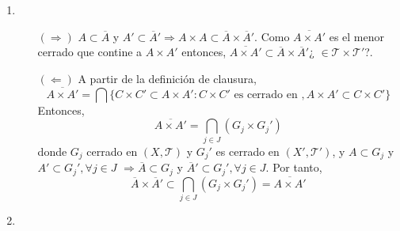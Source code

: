 \begin{sol}
\begin{enumerate}[label=(\roman*)]
    \item \begin{enumerate}[label=(\roman*)]
      \item []
      \item [$(\Rightarrow)$] $A \subset \overline{A}$ y $A' \subset \overline{A}' \Rightarrow A \times A \subset \overline{A} \times \overline{A}' $. Como $\overline{A \times A'}$ es el menor cerrado que contine a $A \times A'$ entonces, $\overline{A \times A'} \subset \overline{A} \times \overline{A}'$¿ $\in \mathcal{T} \times \mathcal{T}'$?. 
      \item [$(\Leftarrow)$] A partir de la definición de clausura,
        \[
          \overline{A \times A'} = \bigcap \{ C \times C' \subset A \times A' : C \times C' \text{ es cerrado en }, A \times A' \subset C \times C' \}
        \]
        Entonces,
        \[ 
          \overline{A \times A'} = \bigcap_{j \in J} (G_{j} \times G_{j}')
        \] 
        donde $G_{j}$ cerrado en $( X, \mathcal{T} )$ y $G_{j}'$ es cerrado en $( X', \mathcal{T}' )$, y $A \subset G_{j}$ y $A' \subset G_{j}', \forall j \in J$ $\Rightarrow \overline{A} \subset G_{j}$ y $\overline{A}' \subset G_{j}', \forall j \in J$. Por tanto,
        \[ 
          \overline{A} \times \overline{A}' \subset \bigcap_{j \in J} (G_{j} \times G_{j}') = \overline{A \times A'}
        \] 
    \end{enumerate}
    \item 
  \end{enumerate}
\end{sol}
